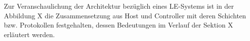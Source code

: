 
Zur Veranschaulichung der Architektur bezüglich eines LE-Systems ist in der Abbildung X
die Zusammensetzung aus Host und Controller mit deren Schichten bzw. Protokollen festgehalten, dessen Bedeutungen im Verlauf der Sektion X
erläutert werden.

